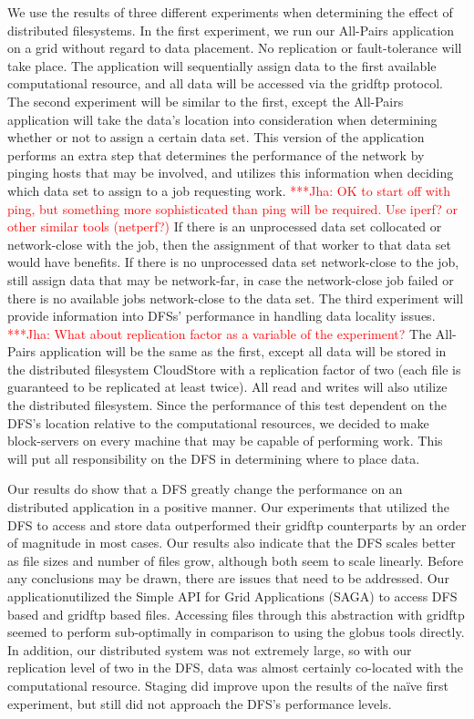 \documentclass[a4paper,11pt]{article}
\newcommand{\jhanote}[1]{ {\textcolor{red} { ***Jha: #1 }}}
\newcommand{\jhanote}[1]{}
\begin{document}
We use the results of three different experiments when determining the effect of distributed filesystems. In the first experiment, we run our All-Pairs application on a grid without regard to data placement. No replication or fault-tolerance will take place. The application will sequentially assign data to the first available computational resource, and all data will be accessed via the gridftp protocol. The second experiment will be similar to the first, except the All-Pairs application will take the data's location into consideration when determining whether or not to assign a certain data set. This version of the application performs an extra step that determines the performance of the network by pinging hosts that may be involved, and utilizes this information when deciding which data set to assign to a job requesting work. \jhanote{OK to start off with ping, but something more sophisticated than ping will be required. Use iperf? or other similar tools (netperf?)} If there is an unprocessed data set collocated or network-close with the job, then the assignment of that worker to that data set would have benefits. If there is no unprocessed data set network-close to the job, still assign data that may be network-far, in case the network-close job failed or there is no available jobs network-close to the data set. The third experiment will provide information into DFSs' performance in handling data locality issues. \jhanote{What about replication factor as a variable of the experiment?} The All-Pairs application will be the same as the first, except all data will be stored in the distributed filesystem CloudStore with a replication factor of two (each file is guaranteed to be replicated at least twice). All read and writes will also utilize the distributed filesystem. Since the performance of this test dependent on the DFS's location relative to the computational resources, we decided to make block-servers on every machine that may be capable of performing work. This will put all responsibility on the DFS in determining where to place data.

Our results do show that a DFS greatly change the performance on an distributed application in a positive manner. Our experiments that utilized the DFS to access and store data outperformed their gridftp counterparts by an order of magnitude in most cases. Our results also indicate that the DFS scales better as file sizes and number of files grow, although both seem to scale linearly. Before any conclusions may be drawn, there are issues that need to be addressed. Our applicationutilized the Simple API for Grid Applications (SAGA) to access DFS based and gridftp based files. Accessing files through this abstraction with gridftp seemed to perform sub-optimally in comparison to using the globus tools directly. In addition, our distributed system was not extremely large, so with our replication level of two in the DFS, data was almost certainly co-located with the computational resource. Staging did improve upon the results of the naïve first experiment, but still did not approach the DFS's performance levels. 
\end{document}
